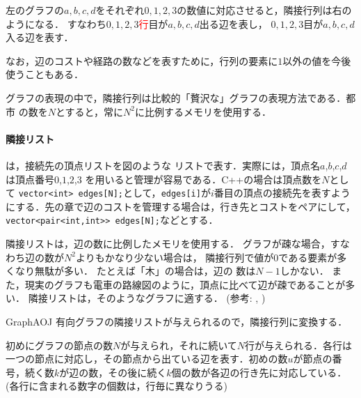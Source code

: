 左のグラフの$a,b,c,d$をそれぞれ$0,1,2,3$の数値に対応させると，隣接行列は右のようになる．
すなわち$0,1,2,3$\textcolor{red}{行}目が$a,b,c,d$出る辺を表し，
$0,1,2,3$目が$a,b,c,d$入る辺を表す．

なお，辺のコストや経路の数などを表すために，行列の要素に$1$以外の値を今後使うこともある．

グラフの表現の中で，隣接行列は比較的「贅沢な」グラフの表現方法である．都市
の数を$N$とすると，常に$N^2$に比例するメモリを使用する．

\paragraph{隣接リスト}

は，接続先の頂点リストを図のような
リストで表す．実際には，頂点名$a$,$b$,$c$,$d$は頂点番号$0$,$1$,$2$,$3$
を用いると管理が容易である．C++の場合は頂点数を$N$として
\texttt{vector<int> edges[N];}として，\texttt{edges[i]}が$i$番目の頂点の接続先を表すようにする．先の章で辺のコストを管理する場合は，行き先とコストをペアにして，\texttt{vector<pair<int,int>> edges[N];}などとする．

\begin{center}
\end{center}

隣接リストは，辺の数に比例したメモリを使用する．
グラフが疎な場合，すなわち辺の数が$N^2$よりもかなり少ない場合は，
隣接行列で値が$0$である要素が多くなり無駄が多い．
たとえば「木」の場合は，辺の
数は$N-1$しかない．
また，現実のグラフも電車の路線図のように，頂点に比べて辺が疎であることが多い．
隣接リストは，そのようなグラフに適する．
(参考: \pcaojbook[pp.~264--(12章)], \pccbook[pp.~90,~91])

\begin{psbox}{Graph}{AOJ}
有向グラフの隣接リストが与えられるので，隣接行列に変換する．

初めにグラフの節点の数$N$が与えられ，それに続いて$N$行が与えられる．各行は一つの節点に対応し，その節点から出ている辺を表す．初めの数$u$が節点の番号，続く数$k$が辺の数，その後に続く$k$個の数が各辺の行き先に対応している．(各行に含まれる数字の個数は，行毎に異なりうる)

\end{psbox}

